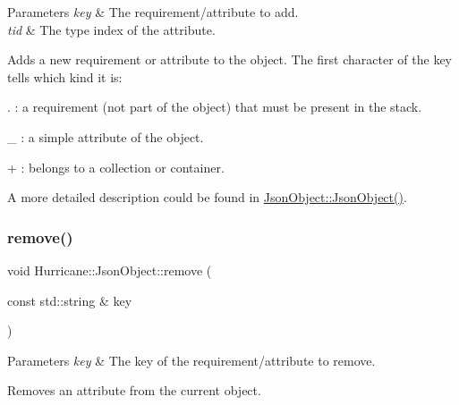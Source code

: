 \begin{DoxyParams}{Parameters}
{\em key} & The requirement/attribute to add. \\
\hline
{\em tid} & The type index of the attribute.\\
\hline
\end{DoxyParams}
Adds a new requirement or attribute to the object. The first character of the key tells which kind it is\+:
\begin{DoxyItemize}
\item {\ttfamily \textquotesingle{}}.\textquotesingle{} \+: a requirement (not part of the object) that must be present in the stack.
\item {\ttfamily \textquotesingle{}\+\_\+\textquotesingle{}} \+: a simple attribute of the object.
\item {\ttfamily \textquotesingle{}+\textquotesingle{}} \+: belongs to a collection or container.
\end{DoxyItemize}

A more detailed description could be found in \hyperlink{classHurricane_1_1JsonObject_a57d9c022204b30d4b253c2588f2c1215}{Json\+Object\+::\+Json\+Object()}. \mbox{\label{classHurricane_1_1JsonObject_a6435e5a8655a6b42b61d55e7fd673c65}} 
\subsubsection{\texorpdfstring{remove()}{remove()}}
{\footnotesize\ttfamily void Hurricane\+::\+Json\+Object\+::remove (\begin{DoxyParamCaption}\item[{const std\+::string \&}]{key }\end{DoxyParamCaption})}


\begin{DoxyParams}{Parameters}
{\em key} & The key of the requirement/attribute to remove.\\
\hline
\end{DoxyParams}
Removes an attribute from the current object. \mbox{\label{classHurricane_1_1JsonObject_af599fb8e2f3aca9c00dc628927367cb8}} 
